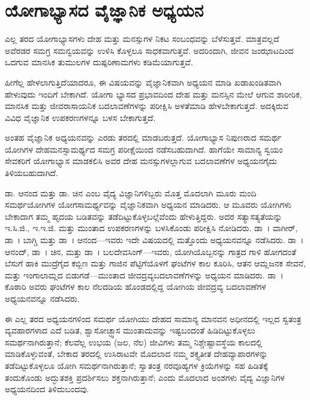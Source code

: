 
\chapter{ ಯೋಗಾಭ್ಯಾಸದ ವೈಜ್ಞಾನಿಕ ಅಧ್ಯಯನ}

ಎಲ್ಲ ತರದ ಯೋಗಾಭ್ಯಾಸಗಳು ದೇಹ ಮತ್ತು ಮನಸ್ಸುಗಳ ನಿಕಟ ಸಂಬಂಧವನ್ನು ಬೆಳೆಸುತ್ತವೆ. ಮಾತ್ರವಲ್ಲದೆ ಅವೆರಡರ ಸಮಗ್ರ ಸಮನ್ವಯವನ್ನು ಉಳಿಸಿ ಕೊಳ್ಳಲೂ ಸಾಧಕವಾಗುತ್ತವೆ. ಅದರಿಂದಾಗಿ, ಜೀವನ ಜಂಝಾಟದಿಂದ ಒದಗುವ ಮಾನಸಿಕ ತುಮುಲಗಳ ದುಷ್ಪರಿಣಾಮಗಳು ಕಡಿಮೆಯಾಗುತ್ತವೆ.

ಹೀಗೆಲ್ಲ ಹೇಳಲಾಗುತ್ತಿದೆಯಾದರೂ, ಈ ವಿಷಯವನ್ನು ವೈಜ್ಞಾನಿಕವಾಗಿ ಅಧ್ಯಯನ ಮಾಡಿ ಖಡಾಖಂಡಿತವಾಗಿ ಹೇಳುವುದು ಇಂದಿಗೆ ಬೇಕಾಗಿದೆ. ಯೋಗಾ ಭ್ಯಾಸದ ಪ್ರಭಾವದಿಂದ ದೇಹ ಮತ್ತು ಮನಸ್ಸಿನ ಮೇಲೆ ಆಗುವ ಶಾರೀರಿಕ, ಮಾನಸಿಕ ಮತ್ತು ಜೀವರಾಸಾಯನಿಕ ಬದಲಾವಣೆಗಳನ್ನು ಪರೀಕ್ಷಿಸಿ ಅಳತೆಮಾಡಿ ಹೇಳಬೇಕಾಗುತ್ತದೆ. ಅದಕ್ಕಿರುವ ವಿವಿಧ ವೈಜ್ಞಾನಿಕ ಉಪಕರಣಗಳನ್ನೂ ಬಳಸ ಬೇಕಾಗುತ್ತದೆ.

ಅಂತಹ ವೈಜ್ಞಾನಿಕ ಅಧ್ಯಯನವನ್ನು ಎರಡು ತರದಲ್ಲಿ ಮಾಡಬರುತ್ತದೆ.  ಯೋಗಾಭ್ಯಾಸ ನಿಪುಣರಾದ ಸಮರ್ಥ ಯೋಗಿಗಳ ದೇಹಮನಸ್ಸಾಮರ್ಥ್ಯದ ಸಮಗ್ರ ಪರೀಕ್ಷೆಯಿಂದ ನಡೆಸಬಹುದಾಗಿದೆ. ಹಾಗೆಯೇ  ಸಾಮಾನ್ಯ ಸ್ವಯಂ ಸೇವಕರಿಗೆ ಯೋಗಾಭ್ಯಾಸ ಮಾಡಕಲಿಸಿ ಅವರ ದೇಹ ಮನಸ್ಸುಗಳಲ್ಲಾಗುವ ಬದಲಾವಣೆಗಳ ಅಧ್ಯಯನಗೈದು ತಿಳಿಯಬಹುದಾಗಿದೆ.

ಡಾ. ಆನಂದ ಮತ್ತು ಡಾ. ಚಿನ ಎಂಬ ವೈದ್ಯ ವಿಜ್ಞಾನಿಗಳಿಬ್ಬರು ಮೊತ್ತ ಮೊದಲಾಗಿ ಮೂರು ಮಂದಿ ಸಮರ್ಥಯೋಗಿಗಳ ಯೋಗಸಾಮರ್ಥ್ಯವನ್ನು ವೈಜ್ಞಾನಿಕವಾಗಿ ಅಧ್ಯಯನ ಮಾಡಿದರು. ಆ ಮೂವರು ಯೋಗಿಗಳು ಬೇಕಾದಾಗ ತಮ್ಮ ಹೃದಯ ಬಡಿತವನ್ನು ತಡೆದಿಟ್ಟುಕೊಳ್ಳಬಲ್ಲೆವೆಂದು ಹೇಳುತ್ತಿದ್ದರು. ಅದರ ಸತ್ಯಾಸತ್ಯತೆಯನ್ನು ಇ.ಸಿ.ಜಿ., ಇ.ಇ.ಜಿ. ಮತ್ತು  ಮುಂತಾದ ಉಪಕರಣಗಳನ್ನು ಬಳಸಿಕೊಂಡು ಪರೀಕ್ಷಿಸಿ ನೋಡಿದರು. ಡಾ~। ವಾಗೀರ್, ಡಾ~। ಬಾಗ್ಚಿ ಮತ್ತು ಡಾ~। ಆನಂದ—ಇವರು ಇದೇ ವಿಷಯದಲ್ಲಿ ಮತ್ತೊಂದು ಅಧ್ಯಯನವನ್ನೂ ನಡೆಸಿದರು. ಡಾ~। ಆನಂದ್, ಡಾ~। ಚಿನ, ಮತ್ತು ಡಾ~। ಬಲದೇವಸಿಂಗ್​—ಇವರು, ಯೋಗಿಯೊಬ್ಬನನ್ನು  ಗಾತ್ರದ ಗಾಳಿ ಹೋಗದಂತೆ ಬೆಸುಗೆ ಹಾಕಿ ಮುದ್ರೆಗೈದ ಕಬ್ಬಿಣ ಮತ್ತು ಗಾಜಿನ ಪೆಟ್ಟಿಗೆಯೊಳಗೆ  ಘಂಟೆಗಳ ಕಾಲ ಕೂರಿಸಿ, ಆತನ ಆಮ್ಲಜನಕ  ಸೇವನೆ, ಮತ್ತು ಇಂಗಾಲಾಮ್ಲದ  ಬಿಡುಗಡೆ—ಮುಂತಾದ ಜೀವದ್ರವ್ಯಬದಲಾವಣೆಗಳನ್ನು ಅಧ್ಯಯನ ಮಾಡಿದರು. ಡಾ~। ಕೊಠಾರಿ ಅವರು  ಘಂಟೆಗಳ ಕಾಲ ನೆಲದಡಿಯ ಹೊಂಡದಲ್ಲಿದ್ದ ಯೋಗಿಯ ಜೀವದ್ರವ್ಯ ಬದಲಾವಣೆಗಳ ಅಧ್ಯಯನವನ್ನೂ ನಡೆಸಿದರು.

ಈ ಎಲ್ಲ ತರದ ಅಧ್ಯಯನಗಳಿಂದ ಸಮರ್ಥ ಯೋಗಿಯು ದೇಹದ ಸಾಮಾನ್ಯ ಮಾನವನ ಅಧೀನದಲ್ಲಿ ಇಲ್ಲದ ಸ್ವತಂತ್ರ ವ್ಯವಹಾರಗಳಾದ ಎದೆ ಬಡಿತ, ಶ್ವಾಸೋಚ್ಛ್ವಾಸ ಮುಂತಾದುವನ್ನು ಇಷ್ಟಬಂದಂತೆ ಹಿಡಿದಿಟ್ಟುಕೊಳ್ಳಲು ಸಮರ್ಥನಾಗಿರುತ್ತಾನೆ; ಕೆಲವೆಲ್ಲ ಉಭಯ (ಜಲ, ನೆಲ) ಜೀವಿಗಳು ತಮ್ಮ ನಿಶ್ಚೇಷ್ಟಾವಸ್ಥೆಯ ಕಾಲದಲ್ಲಿ ಮಾಡಿಕೊಳ್ಳುವಂತೆ, ಬೇಕಾದ ತರದಲ್ಲಿ ಉಸಿರಾಟವೇ ಮೊದಲಾದ ನಮ್ಮ ಶಕ್ತ್ಯತೀತ ದೇಹವ್ಯಾಪಾರಗಳನ್ನು ತಡೆದಿಟ್ಟುಕೊಳ್ಳಲೂ ಯೋಗಿ ಸಮರ್ಥನಾಗಿರುತ್ತಾನೆ; ಸ್ವಾತಂತ್ರ ನರವೂಹ್ಯಗಳ ಕ್ರಿಯೆಗಳನ್ನು ಸಹ ಹಿಡಿತಕ್ಕೆ ತಂದುಕೊಂಡು ಅದ್ಭುತಶಕ್ತಿ ಪ್ರದರ್ಶಿಸಲು ಶಕ್ತನಾಗಿರುತ್ತಾನೆ; ಎಂದು ಮೊದಲಾದ ಅಂಶಗಳು ವೈದ್ಯ ವಿಜ್ಞಾನಿಗಳ ಅಧ್ಯಯನದಿಂದ ತಿಳಿದುಬಂದವು.

